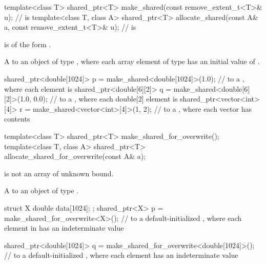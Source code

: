 %
%
\begin{itemdecl}
template<class T>
  shared_ptr<T> make_shared(const remove_extent_t<T>& u);       //  is 
template<class T, class A>
  shared_ptr<T> allocate_shared(const A& a,
                                const remove_extent_t<T>& u);   //  is 
\end{itemdecl}

\begin{itemdescr}
\pnum
\constraints
{} is of the form .

\pnum
\returns
A  to an object of type ,
where each array element of type 
has an initial value of .

\pnum
\begin{example}
\begin{codeblock}
shared_ptr<double[1024]> p = make_shared<double[1024]>(1.0);
  //  to a , where each element is 
shared_ptr<double[6][2]> q = make_shared<double[6][2]>({1.0, 0.0});
  //  to a , where each double[2] element is 
shared_ptr<vector<int>[4]> r = make_shared<vector<int>[4]>({1, 2});
  //  to a , where each vector has contents 
\end{codeblock}
\end{example}
\end{itemdescr}

%
%
\begin{itemdecl}
template<class T>
  shared_ptr<T> make_shared_for_overwrite();
template<class T, class A>
  shared_ptr<T> allocate_shared_for_overwrite(const A& a);
\end{itemdecl}

\begin{itemdescr}
\pnum
\constraints
{} is not an array of unknown bound.

\pnum
\returns
A  to an object of type .

\pnum
\begin{example}
\begin{codeblock}
struct X { double data[1024]; };
shared_ptr<X> p = make_shared_for_overwrite<X>();
  //  to a default-initialized , where each element in  has an indeterminate value

shared_ptr<double[1024]> q = make_shared_for_overwrite<double[1024]>();
  //  to a default-initialized , where each element has an indeterminate value
\end{codeblock}
\end{example}
\end{itemdescr}

